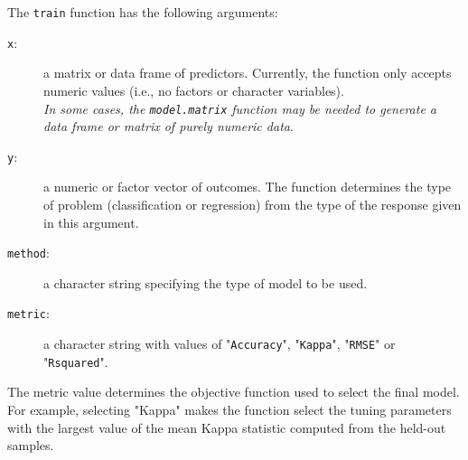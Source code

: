 \documentclass[caret-main.tex]{subfiles}
\begin{document}

\noindent The \texttt{train} function has the following arguments:
\begin{description}
\item[\texttt{x}:] a matrix or data frame of predictors. Currently, the function only accepts numeric
values (i.e., no factors or character variables). \\ \textit{In some cases, the \texttt{model.matrix} function may be needed to generate a data frame or matrix of purely numeric data}.
\vspace{0.4cm}
\item[\texttt{y}:] a numeric or factor vector of outcomes. The function determines the type of problem
(classification or regression) from the type of the response given in this argument.
\vspace{0.4cm}
\item[\texttt{method}:] a character string specifying the type of model to be used.
\vspace{0.4cm}
\item[\texttt{metric}:] a character string with values of "\texttt{Accuracy}", "\texttt{Kappa}", "\texttt{RMSE}" or "\texttt{Rsquared}".

\end{description}
\bigskip
The metric value determines the objective function used to select the final model. For example,
selecting "Kappa" makes the function select the tuning parameters with the largest value
of the mean Kappa statistic computed from the held-out samples.
\end{document}

